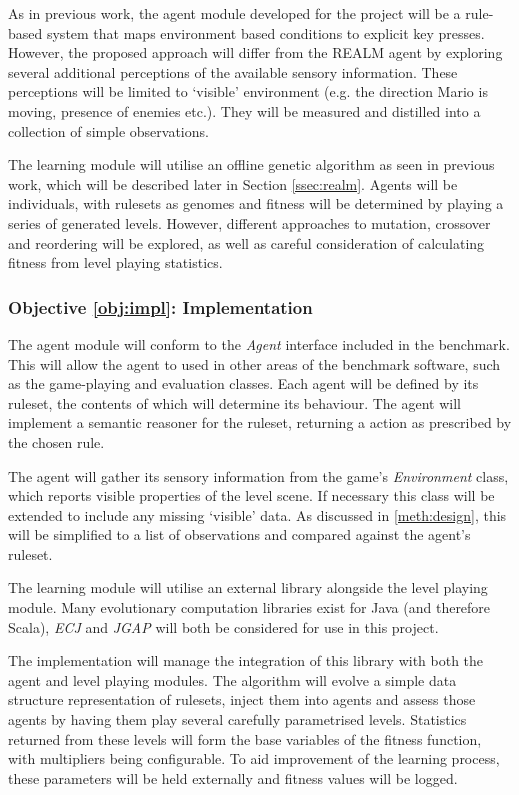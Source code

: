 As in previous work, the agent module developed for the project will be a rule-based system that maps environment based conditions to explicit key presses. However, the proposed approach will differ from the REALM agent by exploring several additional perceptions of the available sensory information. These perceptions will be limited to `visible' environment (e.g. the direction Mario is moving, presence of enemies etc.). They will be measured and distilled into a collection of simple observations.

The learning module will utilise an offline genetic algorithm as seen in previous work, which will be described later in Section \ref{ssec:realm}. Agents will be individuals, with rulesets as genomes and fitness will be determined by playing a series of generated levels. However, different approaches to mutation, crossover and reordering will be explored, as well as careful consideration of calculating fitness from level playing statistics.

\subsubsection*{Objective \ref{obj:impl}: Implementation}
\label{meth:impl}

The agent module will conform to the \emph{Agent} interface included in the benchmark. This will allow the agent to used in other areas of the benchmark software, such as the game-playing and evaluation classes. Each agent will be defined by its ruleset, the contents of which will determine its behaviour. The agent will implement a semantic reasoner for the ruleset, returning a action as prescribed by the chosen rule.

The agent will gather its sensory information from the game's \emph{Environment} class, which reports visible properties of the level scene. If necessary this class will be extended to include any missing `visible' data. As discussed in \ref{meth:design}, this will be simplified to a list of observations and compared against the agent's ruleset.

\vspace{\baselineskip}

The learning module will utilise an external library alongside the level playing module. Many evolutionary computation libraries exist for Java (and therefore Scala), \emph{ECJ} \cite{ecj} and \emph{JGAP} \cite{jgap} will both be considered for use in this project.

The implementation will manage the integration of this library with both the agent and level playing modules. The algorithm will evolve a simple data structure representation of rulesets, inject them into agents and assess those agents by having them play several carefully parametrised levels. Statistics returned from these levels will form the base variables of the fitness function, with multipliers being configurable. To aid improvement of the learning process, these parameters will be held externally and fitness values will be logged.

